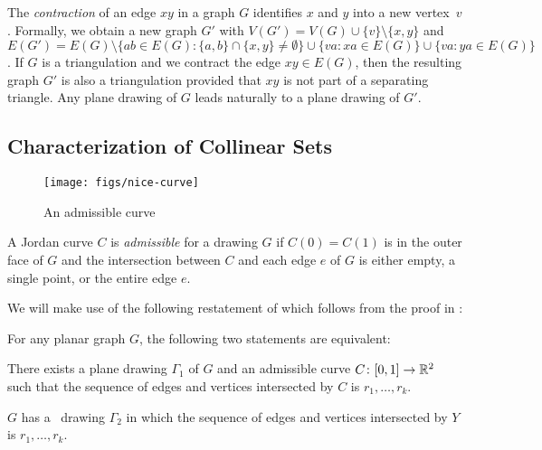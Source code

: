 The \emph{contraction} of an edge $xy$ in a graph $G$ identifies $x$
and $y$
into a new vertex~$v$.
Formally, we obtain a new graph $G'$ with
$V(G')=V(G)\cup\{v\}\setminus\{x,y\}$ and $E(G')=E(G)\setminus\{ab\in
E(G): \{a,b\}\cap\{x,y\}\neq\emptyset\}\cup\{va: xa\in E(G)\}\cup
\{va:ya\in E(G)\}$.  
If $G$ is a triangulation and we
contract the edge $xy\in E(G)$, then the resulting graph $G'$ is also
a triangulation provided that $xy$ is not part of a separating
triangle. %
Any plane drawing of $G$ leads naturally
to a plane drawing of $G'$.

\subsection{Characterization of Collinear Sets}


\begin{figure}[htb]
  \centering
  \texttt{[image: figs/nice-curve]}
  \caption{An admissible curve}
  \label{fig:admissible}
\end{figure}

A %
Jordan curve $C$ is \emph{admissible} for a drawing $G$ if $C(0)=C(1)$ is in the outer face
of $G$ and the intersection between $C$ and each edge $e$ of $G$ is
either empty, a single point, or the entire edge $e$.  


We will make use of the following restatement of 
which follows from the proof in \cite{dalozzo.dujmovic.ea:drawing}:
\begin{thm}
	For any planar graph $G$, the following two statements are equivalent:
	\begin{compactenum}
		\item There exists a plane drawing $\Gamma_1$ of $G$ and an
		admissible curve $C\colon [0,1]\to\mathbb{R}^2$ such that the sequence of edges
		and vertices intersected by $C$ is $r_1,\ldots,r_k$.
		\item $G$ has a \Fary\ drawing $\Gamma_2$ in which the sequence
		of edges and vertices intersected by $Y$ is $r_1,\ldots,r_k$.
	\end{compactenum}
\end{thm}


